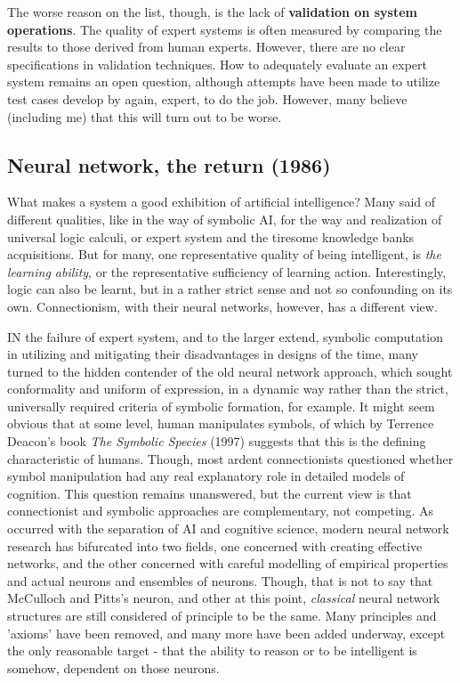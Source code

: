 The worse reason on the list, though, is the lack of \textbf{validation on system operations}. The quality of expert systems is often measured by comparing the results to those derived from human experts. However, there are no clear specifications in validation techniques. How to adequately evaluate an expert system remains an open question, although attempts have been made to utilize test cases develop by again, expert, to do the job. However, many believe (including me) that this will turn out to be worse. 

\subsection{Neural network, the return (1986)}

What makes a system a good exhibition of artificial intelligence? Many said of different qualities, like in the way of symbolic AI, for the way and realization of universal logic calculi, or expert system and the tiresome knowledge banks acquisitions. But for many, one representative quality of being intelligent, is \textit{the learning ability}, or the representative sufficiency of learning action. Interestingly, logic can also be learnt, but in a rather strict sense and not so confounding on its own. Connectionism, with their neural networks, however, has a different view. 

IN the failure of expert system, and to the larger extend, symbolic computation in utilizing and mitigating their disadvantages in designs of the time, many turned to the hidden contender of the old neural network approach, which sought conformality and uniform of expression, in a dynamic way rather than the strict, universally required criteria of symbolic formation, for example. It might seem obvious that at some level, human manipulates symbols, of which by Terrence Deacon's book \textit{The Symbolic Species} (1997) suggests that this is the defining characteristic of humans. Though, most ardent connectionists questioned whether symbol manipulation had any real explanatory role in detailed models of cognition. This question remains unanswered, but the current view is that connectionist and symbolic approaches are complementary, not competing. As occurred with the separation of AI and cognitive science, modern neural network research has bifurcated into two fields, one concerned with creating effective networks, and the other concerned with careful modelling of empirical properties and actual neurons and ensembles of neurons. Though, that is not to say that McCulloch and Pitts's neuron, and other at this point, \textit{classical} neural network structures are still considered of principle to be the same. Many principles and 'axioms' have been removed, and many more have been added underway, except the only reasonable target - that the ability to reason or to be intelligent is somehow, dependent on those neurons. 
